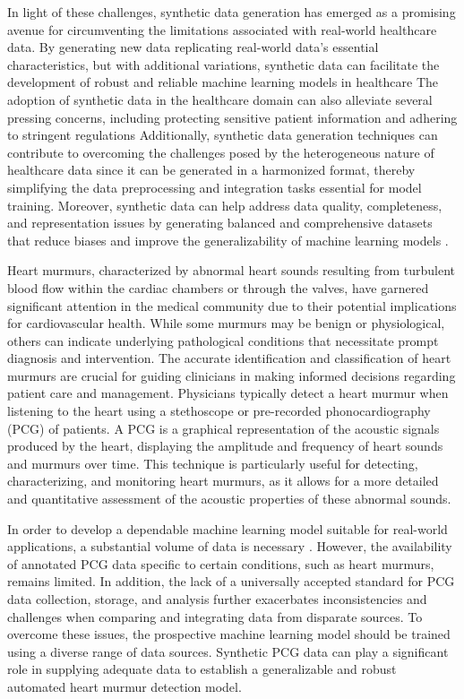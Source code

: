 \documentclass{article}
\begin{document}
\par In light of these challenges, synthetic data generation has emerged as a promising avenue for circumventing the limitations associated with real-world healthcare data. By generating new data replicating real-world data's essential characteristics, but with additional variations, synthetic data can facilitate the development of robust and reliable machine learning models in healthcare \cite{chen2021synthetic,murtaza2023synthetic} The adoption of synthetic data in the healthcare domain can also alleviate several pressing concerns, including protecting sensitive patient information and adhering to stringent regulations \cite{gonzales2023synthetic} Additionally, synthetic data generation techniques can contribute to overcoming the challenges posed by the heterogeneous nature of healthcare data since it can be generated in a harmonized format, thereby simplifying the data preprocessing and integration tasks essential for model training. Moreover, synthetic data can help address data quality, completeness, and representation issues by generating balanced and comprehensive datasets that reduce biases and improve the generalizability of machine learning models \cite{das2022conditional}.

\par Heart murmurs, characterized by abnormal heart sounds resulting from turbulent blood flow within the cardiac chambers or through the valves, have garnered significant attention in the medical community due to their potential implications for cardiovascular health. While some murmurs may be benign or physiological, others can indicate underlying pathological conditions that necessitate prompt diagnosis and intervention. The accurate identification and classification of heart murmurs are crucial for guiding clinicians in making informed decisions regarding patient care and management. Physicians typically detect a heart murmur when listening to the heart using a stethoscope or pre-recorded phonocardiography (PCG) of patients. A PCG is a graphical representation of the acoustic signals produced by the heart, displaying the amplitude and frequency of heart sounds and murmurs over time. This technique is particularly useful for detecting, characterizing, and monitoring heart murmurs, as it allows for a more detailed and quantitative assessment of the acoustic properties of these abnormal sounds.

\par In order to develop a dependable machine learning model suitable for real-world applications, a substantial volume of data is necessary \cite{alom2019state}. However, the availability of annotated PCG data specific to certain conditions, such as heart murmurs, remains limited. In addition, the lack of a universally accepted standard for PCG data collection, storage, and analysis further exacerbates inconsistencies and challenges when comparing and integrating data from disparate sources. To overcome these issues, the prospective machine learning model should be trained using a diverse range of data sources. Synthetic PCG data can play a significant role in supplying adequate data to establish a generalizable and robust automated heart murmur detection model.
\end{document}
